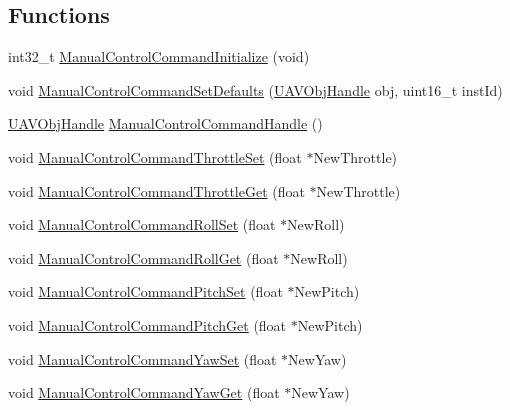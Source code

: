 \subsection*{\-Functions}
\begin{DoxyCompactItemize}
\item 
int32\-\_\-t \hyperlink{group___manual_control_command_ga5636d952eaaf78a09cdad6b6e4f3b711}{\-Manual\-Control\-Command\-Initialize} (void)
\item 
void \hyperlink{group___manual_control_command_ga9bf931b7026a4a9d20409814dfffd946}{\-Manual\-Control\-Command\-Set\-Defaults} (\hyperlink{targets_2_u_a_v_objects_2inc_2uavobjectmanager_8h_a279053e22be53ce9f895043aaeb91e3b}{\-U\-A\-V\-Obj\-Handle} obj, uint16\-\_\-t inst\-Id)
\item 
\hyperlink{targets_2_u_a_v_objects_2inc_2uavobjectmanager_8h_a279053e22be53ce9f895043aaeb91e3b}{\-U\-A\-V\-Obj\-Handle} \hyperlink{group___manual_control_command_ga81a0f39c58aa8cc5b05ac6fc65e122a6}{\-Manual\-Control\-Command\-Handle} ()
\item 
void \hyperlink{group___manual_control_command_gab5cf0e29d622288562de676c2fc7b506}{\-Manual\-Control\-Command\-Throttle\-Set} (float $\ast$\-New\-Throttle)
\item 
void \hyperlink{group___manual_control_command_ga31d31d41969a6f25c726ebc371a2c545}{\-Manual\-Control\-Command\-Throttle\-Get} (float $\ast$\-New\-Throttle)
\item 
void \hyperlink{group___manual_control_command_ga8fb2bdb72f41c8a020cd7c1ae6807389}{\-Manual\-Control\-Command\-Roll\-Set} (float $\ast$\-New\-Roll)
\item 
void \hyperlink{group___manual_control_command_ga462be486ff7c11b2a1e9ff297ef5eed9}{\-Manual\-Control\-Command\-Roll\-Get} (float $\ast$\-New\-Roll)
\item 
void \hyperlink{group___manual_control_command_gac7120ccd2db0b3a08d3963afb51b50d8}{\-Manual\-Control\-Command\-Pitch\-Set} (float $\ast$\-New\-Pitch)
\item 
void \hyperlink{group___manual_control_command_ga983fce1f0e9e9489b81f7efd9113428a}{\-Manual\-Control\-Command\-Pitch\-Get} (float $\ast$\-New\-Pitch)
\item 
void \hyperlink{group___manual_control_command_ga3077d96458a62e5b16f10e7f692196e7}{\-Manual\-Control\-Command\-Yaw\-Set} (float $\ast$\-New\-Yaw)
\item 
void \hyperlink{group___manual_control_command_gabbf23473264c0f3fa0c7e2be9a6c359f}{\-Manual\-Control\-Command\-Yaw\-Get} (float $\ast$\-New\-Yaw)

\end{DoxyCompactItemize}
